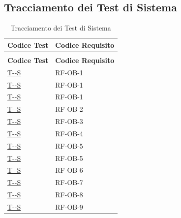 \documentclass[a4paper,12pt]{article}
\newcounter{testsys}
\newcommand{\systestref}{%
  \hyperlink{T-\arabic{testsys}-S}{T-\arabic{testsys}-S}%
}
\begin{document}
\setcounter{testsys}{0}
\begingroup
\subsection{Tracciamento dei Test di Sistema} \label{subsection:tracciamento_test_sistema}
\begin{center}
\renewcommand{\arraystretch}{1.5}

\begin{longtable}{|>{\centering\arraybackslash}p{5cm}|>{\centering\arraybackslash}p{9cm}|}

\hline
\rowcolor{gray!60}
\textbf{Codice Test} & \textbf{Codice Requisito} \\
\hline
\endfirsthead
\caption[]{Tracciamento dei Test di Sistema} \\
\hline
\rowcolor{gray!60}
\textbf{Codice Test} & \textbf{Codice Requisito} \\
\hline
\endhead

\stepcounter{testsys}
\systestref & RF-OB-1 \\
\hline

\stepcounter{testsys}
\systestref & RF-OB-1 \\
\hline

\stepcounter{testsys}
\systestref & RF-OB-1 \\
\hline

\stepcounter{testsys}
\systestref & RF-OB-2 \\
\hline

\stepcounter{testsys}
\systestref & RF-OB-3 \\
\hline

\stepcounter{testsys}
\systestref & RF-OB-4 \\
\hline

\stepcounter{testsys}
\systestref & RF-OB-5 \\
\hline

\stepcounter{testsys}
\systestref & RF-OB-5 \\
\hline

\stepcounter{testsys}
\systestref & RF-OB-6 \\
\hline

\stepcounter{testsys}
\systestref & RF-OB-7 \\
\hline

\stepcounter{testsys}
\systestref & RF-OB-8 \\
\hline

\stepcounter{testsys}
\systestref & RF-OB-9 \\
\hline


\end{longtable}
\end{center}
\end{document}
